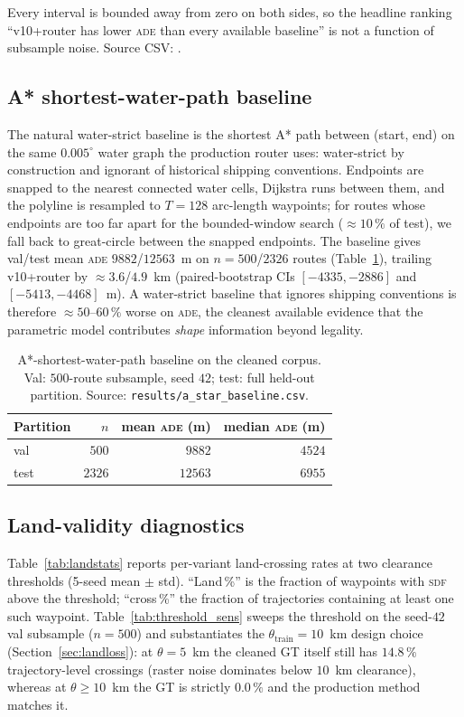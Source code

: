 \documentclass[oneside, a4paper, onecolumn, 11pt]{article}
\newcommand{\ade}{\textsc{ade}}
\newcommand{\sdf}{\textsc{sdf}}
\DeclareRobustCommand{\fpath}{\path}
\begin{document}
\noindent
Every interval is bounded away from zero on both sides, so the
headline ranking ``v10+router has lower \ade{} than every available
baseline'' is not a function of subsample noise.  Source CSV:
\fpath{results/paired_bootstrap_ci.csv}.

\subsection{A* shortest-water-path baseline}
\label{sec:astar_baseline}

The natural water-strict baseline is the shortest A* path between
(start, end) on the same $0.005^{\circ}$ water graph the production
router uses: water-strict by construction and ignorant of historical
shipping conventions.  Endpoints are snapped to the nearest connected
water cells, Dijkstra runs between them, and the polyline is
resampled to $T=128$ arc-length waypoints; for routes whose endpoints
are too far apart for the bounded-window search ($\approx 10\,\%$ of
test), we fall back to great-circle between the snapped endpoints.
The baseline gives val/test mean \ade{} $9882$/$12563$~m on
$n=500$/$2326$ routes (Table~\ref{tab:astar}), trailing v10+router
by $\approx 3.6$/$4.9$~km (paired-bootstrap CIs $[-4335,-2886]$ and
$[-5413,-4468]$~m).  A water-strict baseline that ignores shipping
conventions is therefore $\approx 50$--$60\,\%$ worse on \ade{}, the
cleanest available evidence that the parametric model contributes
\emph{shape} information beyond legality.

\begin{table}[h]
\centering
\caption{A*-shortest-water-path baseline on the cleaned corpus.
Val: $500$-route subsample, seed $42$; test: full held-out partition.
Source: \texttt{results/a\_star\_baseline.csv}.}
\label{tab:astar}
\begin{tabular}{lrrr}
\toprule
\textbf{Partition} & $n$ & mean \ade{} (m) & median \ade{} (m) \\
\midrule
val  & $500$  & $9882$  & $4524$ \\
test & $2326$ & $12563$ & $6955$ \\
\bottomrule
\end{tabular}
\end{table}

\subsection{Land-validity diagnostics}

Table~\ref{tab:landstats} reports per-variant land-crossing rates at
two clearance thresholds (5-seed mean $\pm$ std).  ``Land\,\%'' is
the fraction of waypoints with \sdf{} above the threshold;
``cross\,\%'' the fraction of trajectories containing at least one
such waypoint.  Table~\ref{tab:threshold_sens} sweeps the threshold
on the seed-$42$ val subsample ($n=500$) and substantiates the
$\theta_{\mathrm{train}} = 10$~km design choice
(Section~\ref{sec:landloss}): at $\theta = 5$~km the cleaned GT
itself still has $14.8\,\%$ trajectory-level crossings (raster noise
dominates below $10$~km clearance), whereas at $\theta \geq 10$~km
the GT is strictly $0.0\,\%$ and the production method matches it.
\end{document}
